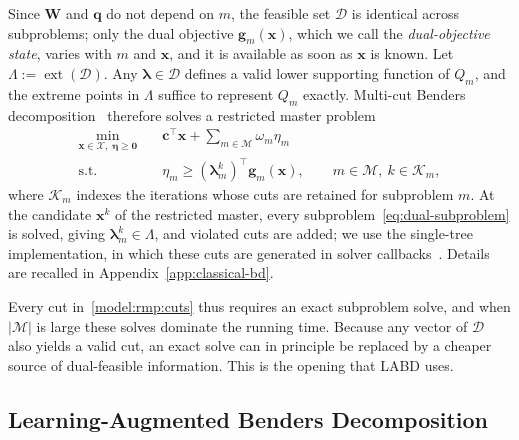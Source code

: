 Since $\mathbf W$ and $\mathbf q$ do not depend on $m$, the feasible set $\mathcal D$ is identical across subproblems; only the dual objective $\mathbf g_m(\mathbf x)$, which we call the \emph{dual-objective state}, varies with $m$ and $\mathbf x$, and it is available as soon as $\mathbf x$ is known. Let $\Lambda:=\operatorname{ext}(\mathcal D)$. Any $\boldsymbol\lambda\in\mathcal D$ defines a valid lower supporting function of $Q_m$, and the extreme points in $\Lambda$ suffice to represent $Q_m$ exactly. Multi-cut Benders decomposition~\cite{geoffrion1970elements,rahmaniani2017benders} therefore solves a restricted master problem
\begin{subequations}\label{model:rmp}
\begin{align}
\min_{\mathbf x\in\mathcal X,\;\boldsymbol\eta\ge\mathbf 0}\quad & \mathbf c^\top\mathbf x+\sum_{m\in\mathcal M}\omega_m\eta_m\\
\text{s.t.}\quad & \eta_m\ge(\boldsymbol\lambda_m^k)^\top\mathbf g_m(\mathbf x),\qquad m\in\mathcal M,\ k\in\mathcal K_m, \label{model:rmp:cuts}
\end{align}
\end{subequations}
where $\mathcal K_m$ indexes the iterations whose cuts are retained for subproblem $m$. At the candidate $\mathbf x^k$ of the restricted master, every subproblem~\eqref{eq:dual-subproblem} is solved, giving $\boldsymbol\lambda_m^k\in\Lambda$, and violated cuts are added; we use the single-tree implementation, in which these cuts are generated in solver callbacks~\cite{rostami2022single}. Details are recalled in Appendix~\ref{app:classical-bd}.

Every cut in~\eqref{model:rmp:cuts} thus requires an exact subproblem solve, and when $|\mathcal M|$ is large these solves dominate the running time. Because any vector of $\mathcal D$ also yields a valid cut, an exact solve can in principle be replaced by a cheaper source of dual-feasible information. This is the opening that LABD uses.

\subsection{Learning-Augmented Benders Decomposition}\label{subsec:labd}

